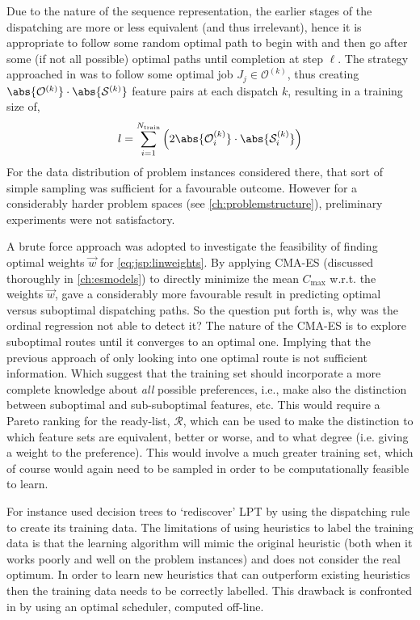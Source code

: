 Due to the nature of the sequence representation, the earlier stages of the dispatching are more or less equivalent (and thus irrelevant), hence it is appropriate to follow some random optimal path to begin with and then go after some (if not all possible) optimal paths until completion at step $\ell$. The strategy approached in  \cite{InRu11a} was to follow some optimal job $J_j\in\mathcal{O}^{(k)}$, thus creating $\abs{\mathcal{O}^{(k)}}\cdot\abs{\mathcal{S}^{(k)}}$ feature pairs at each dispatch $k$, resulting in a training size of,
\begin{equation}\label{eq:sizeS_b}
l =  \sum_{i=1}^{N_{\text{train}}} \left(2 \abs{\mathcal{O}^{(k)}_i}\cdot \abs{\mathcal{S}^{(k)}_i} \right)
\end{equation}
For the data distribution of problem instances considered there, that sort of simple sampling was sufficient for a favourable outcome. However for a considerably harder problem spaces (see \cref{ch:problemstructure}), preliminary experiments were not satisfactory. 

A brute force approach was adopted to investigate the feasibility of finding optimal weights $\vec{w}$ for \cref{eq:jsp:linweights}. By applying CMA-ES (discussed thoroughly in \cref{ch:esmodels}) to directly minimize the mean $C_{\max}$  w.r.t. the weights $\vec{w}$, gave a considerably more favourable result in predicting optimal versus suboptimal dispatching paths. So the question put forth is, why was the ordinal regression not able to detect it?
The nature of the CMA-ES is to explore suboptimal routes until it converges to an optimal one. Implying that the previous approach of only looking into one optimal route is not sufficient information. Which suggest that the training set should incorporate a more complete knowledge about \emph{all} possible preferences, i.e., make also the distinction between suboptimal and sub-suboptimal features, etc.  This would require a Pareto ranking for the ready-list, $\mathcal{R}$, which can be used to make the distinction to which feature sets are equivalent, better or worse, and to what degree (i.e. giving a weight to the preference). This would involve a much greater training set, which of course would again need to be sampled in order to be computationally feasible to learn. 

For instance \cite{Siggi05} used decision trees to `rediscover' LPT by using the dispatching rule to create its training data. The limitations of using heuristics to label the training data is that the learning algorithm will mimic the original heuristic (both when it works poorly and well on the problem instances) and does not consider the real optimum. In order to learn new heuristics that can outperform existing heuristics then the training data needs to be correctly labelled. This drawback is confronted in \citep{Malik08,Russell09,Siggi10} by using an optimal scheduler, computed off-line. 

